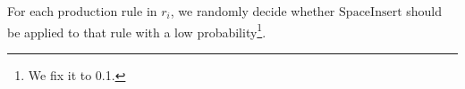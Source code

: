 \begin{itemize}
    For each production rule in $r_i$, we randomly decide whether $\mathrm{SpaceInsert}$ should be applied to that rule with a low probability\footnote{We fix it to 0.1.}.
    

    
    
    

    




\end{itemize}

